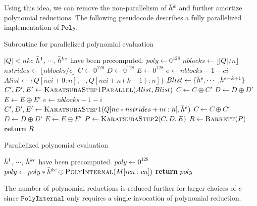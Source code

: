 \documentclass[hctr2.tex]{subfiles}
\begin{document}
Using this idea, we can remove the non-parallelism of $\bar{h}^k$ and further amortize polynomial reductions. The following pseudocode describes a fully parallelized implementation of $\texttt{Poly}$.
\begin{algorithm}[H]
\caption{Subroutine for parallelized polynomial evaluation}\label{polyalgsub}
\begin{algorithmic}[1]
	\Require $|Q| < nkc$
	\Require $\bar{h}^1$, $\cdots$, $\bar{h}^{kc}$ have been precomputed.
		\State $poly \gets 0^{128}$
		\State $nblocks \gets \lfloor |Q|/n \rfloor$
		\State $nstrides \gets \lfloor nblocks/c \rfloor$
		\State $C \gets 0^{128}$
		\State $D \gets 0^{128}$
		\State $E \gets 0^{128}$
			\State $e \gets nblocks - 1 - ci$
			\State $Alist \gets \{Q[nci + 0 : n], \cdots, Q[nci + n(k - 1) : n]\}$
			\State $Blist \gets \{\bar{h}^{e}, \cdots, \bar{h}^{e - k + 1}\}$
			\State $C', D', E' \gets \Call{KaratsubaStep1Parallel}{Alist, Blist}$
			\State $C \gets C \oplus C'$
			\State $D \gets D \oplus D'$
			\State $E \gets E \oplus E'$
		\EndFor
			\State $e \gets nblocks - 1 - i$
			\State $C', D', E' \gets \Call{KaratsubaStep1}{Q[nc*nstrides + ni : n], \hgen^{e}}$
			\State $C \gets C \oplus C'$
			\State $D \gets D \oplus D'$
			\State $E \gets E \oplus E'$
		\EndFor
		\State $P \gets \Call{KaratsubaStep2}{C, D, E}$
		\State $R \gets \Call{Barrett}{P}$
		\State \textbf{return} $R$
	\EndProcedure
\end{algorithmic}
\end{algorithm}

\begin{algorithm}[H]
\caption{Parallelized polynomial evaluation}\label{polyalg}
\begin{algorithmic}[1]
	\Require $\bar{h}^1$, $\cdots$, $\bar{h}^{kc}$ have been precomputed.
		\State $poly \gets 0^{128}$
			\State $poly \gets poly*\hgen^{kc} \oplus \Call{PolyInternal}{M[icn : cn]}$
		\EndFor
		\State \textbf{return} $poly$
	\EndProcedure
\end{algorithmic}
\end{algorithm}
The number of polynomial reductions is reduced further for larger choices of $c$ since $\texttt{PolyInternal}$ only requires a single invocation of polynomial reduction.
\end{document}
